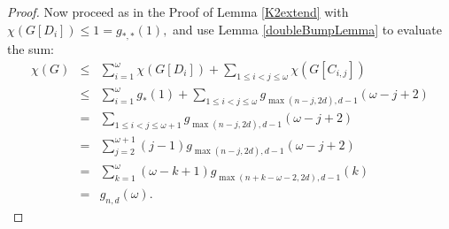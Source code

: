 \documentclass{article}
\theoremstyle{plain}
\theoremstyle{definition}
\begin{document}
\begin{proof}
Now proceed as in the Proof of Lemma \ref{K2extend} with $\chi(G[D_i])\leq  1 =  g_{\ast,\ast}(1),$ and use Lemma \ref{doubleBumpLemma} to evaluate the sum:
\[\begin{array}{rcl} 
\chi(G) & \leq & \displaystyle  \sum_{i=1} ^\omega \chi(G[D_i]) +  \sum_{1\leq i < j \leq \omega}  \chi(G[C_{i,j}]) \\
& \leq & \displaystyle  \sum_{i=1} ^\omega  g_\ast ( 1) +  \sum_{1\leq i < j \leq \omega}   g_{\max(n-j,2d),d-1}( \omega-j+2 ) \\
& = & \displaystyle  \sum_{1\leq i < j \leq \omega+1}   g_{\max(n-j,2d),d-1}( \omega-j+2 ) \\
& = & \displaystyle  \sum_{j=2}^{\omega+1} (j-1) g_{\max(n-j,2d),d-1}( \omega-j+2 ) \\
& = & \displaystyle  \sum_{k=1}^{\omega} (\omega-k+1) g_{\max(n+k-\omega-2,2d),d-1}( k ) \\
& = & g_{n,d}(\omega).
\end{array}
\]
\end{proof}
\end{document}

